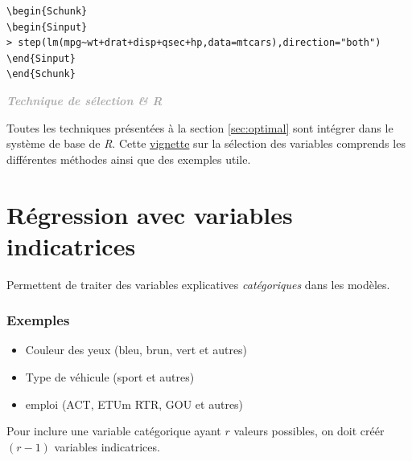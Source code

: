 \documentclass[11pt,french]{report}
\newenvironment{moreInfo}[1]
	{\begin{mdframed}
	\textcolor{darkgray}{\huge \raisebox{-3.5pt}{\faInfo} 
	\hspace{0.5cm} \large\bfseries #1}\\[5pt]
	\normalsize
	\makebox[0.1\textwidth][l]{}	
	\begin{minipage}{10cm}}
	{	\end{minipage}
	\end{mdframed}}
\begin{document}
\begin{lstlisting}[linerange=\\begin\{Sinput\}-\\end\{Sinput\},includerangemarker=false, caption = Code source en R pour l'exemple]
\begin{Schunk}
\begin{Sinput}
> step(lm(mpg~wt+drat+disp+qsec+hp,data=mtcars),direction="both")
\end{Sinput}
\end{Schunk}
\end{lstlisting}

\begin{moreInfo}{\emph{Technique de sélection \& \emph{R}}}
	Toutes les techniques présentées à la section \ref{sec:optimal} sont intégrer dans le système de base de \emph{R}. Cette \href{https://cran.r-project.org/web/packages/olsrr/vignettes/variable_selection.html}{vignette} sur la sélection des variables comprends les différentes méthodes ainsi que des exemples utile.
\end{moreInfo}

\section{Régression avec variables indicatrices}
Permettent de traiter des variables explicatives \emph{catégoriques} dans les modèles.
\subsubsection*{Exemples}
\begin{itemize}
\item Couleur des yeux (bleu, brun, vert et autres)
\item Type de véhicule (sport et autres)
\item emploi (ACT, ETUm RTR, GOU et autres)
\end{itemize}

Pour inclure une variable catégorique ayant $r$ valeurs possibles, on doit créér $(r-1)$ variables indicatrices.
\end{document}
